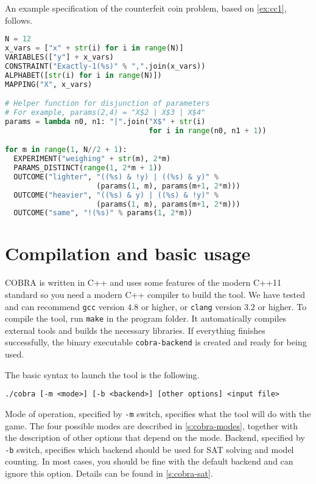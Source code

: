 \begin{example}
An example specification of the counterfeit coin problem,
based on \autoref{ex:cc1}, follows.
\begin{lstlisting}[language=Python]
N = 12
x_vars = ["x" + str(i) for i in range(N)]
VARIABLES(["y"] + x_vars)
CONSTRAINT("Exactly-1(%s)" % ",".join(x_vars))
ALPHABET([str(i) for i in range(N)])
MAPPING("X", x_vars)

# Helper function for disjunction of parameters
# For example, params(2,4) = "X$2 | X$3 | X$4"
params = lambda n0, n1: "|".join("X$" + str(i)
                                 for i in range(n0, n1 + 1))

for m in range(1, N//2 + 1):
  EXPERIMENT("weighing" + str(m), 2*m)
  PARAMS_DISTINCT(range(1, 2*m + 1))
  OUTCOME("lighter", "((%s) & !y) | ((%s) & y)" %
                     (params(1, m), params(m+1, 2*m)))
  OUTCOME("heavier", "((%s) & y) | ((%s) & !y)" %
                     (params(1, m), params(m+1, 2*m)))
  OUTCOME("same", "!(%s)" % params(1, 2*m))
\end{lstlisting}
\end{example}



\section{Compilation and basic usage}

COBRA is written in C++ and uses some features of the modern C++11 standard
  so you need a modern C++ compiler to build the tool.
We have tested and can recommend \texttt{gcc} version $4.8$ or higher,
  or \texttt{clang} version $3.2$ or higher.
To compile the tool, run
  \texttt{make}
  in the program folder.
It automatically compiles external tools and builds the necessary libraries.
If everything finishes successfully,
  the binary executable \texttt{cobra-backend} is created
  and ready for being used.

The basic syntax to launch the tool is the following.

\medskip
\centerline{\texttt{./cobra [-m <mode>] [-b <backend>] [other options] <input file>}}
\medskip


Mode of operation, specified by \texttt{-m} switch,
  specifies what the tool will do with the game.
The four possible modes are described in \autoref{s:cobra-modes},
  together with the description
  of other options that depend on the mode.
Backend, specified by \texttt{-b} switch, specifies which backend should be
  used for SAT solving and model counting.
In most cases, you should be fine with the default backend and can ignore this option.
Details can be found in \autoref{s:cobra-sat}.

